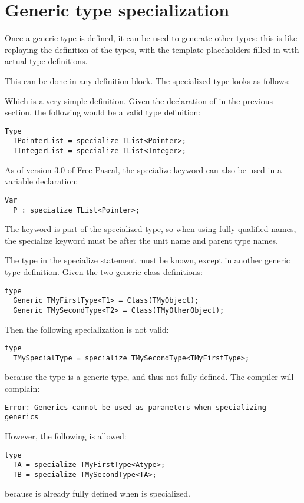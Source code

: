\section{Generic type specialization}
Once a generic type is defined, it can be used to generate other types:
this is like replaying the definition of the types, with the template
placeholders filled in with actual type definitions.

This can be done in any  definition block. The specialized type
looks as follows:

Which is a very simple definition. Given the declaration of  in
the previous section, the following would be a valid type definition:
\begin{verbatim}
Type
  TPointerList = specialize TList<Pointer>;
  TIntegerList = specialize TList<Integer>;
\end{verbatim}
As of version 3.0 of Free Pascal, the specialize keyword can also be used in a variable declaration:
\begin{verbatim}
Var
  P : specialize TList<Pointer>;
\end{verbatim}
The  keyword is part of the specialized type, so when using
fully qualified names, the specialize keyword must be after the unit name
and parent type names.

The type in the specialize statement must be known, except in another generic type definition.
Given the two generic class definitions:
\begin{verbatim}
type
  Generic TMyFirstType<T1> = Class(TMyObject);
  Generic TMySecondType<T2> = Class(TMyOtherObject);
\end{verbatim}
Then the following specialization is not valid:
\begin{verbatim}
type
  TMySpecialType = specialize TMySecondType<TMyFirstType>;
\end{verbatim}
because the type  is a generic type, and thus not fully defined.  The compiler will complain:
\begin{verbatim}
Error: Generics cannot be used as parameters when specializing generics
\end{verbatim}

However, the following is allowed:
\begin{verbatim}
type
  TA = specialize TMyFirstType<Atype>;
  TB = specialize TMySecondType<TA>;
\end{verbatim}
because  is already fully defined when  is specialized.

